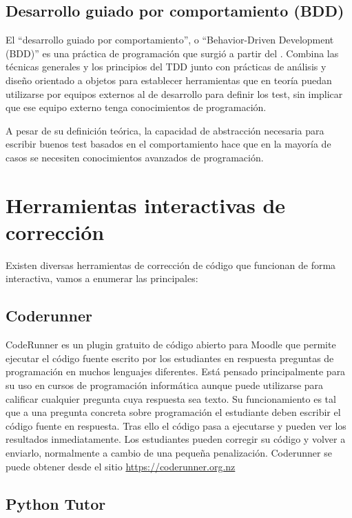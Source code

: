 \subsection {Desarrollo guiado por comportamiento (BDD)}

El ``desarrollo guiado por comportamiento'', o ``Behavior-Driven Development (BDD)'' es una práctica de programación que surgió a partir del . Combina las técnicas generales y los principios del TDD junto con prácticas de análisis y diseño orientado a objetos para establecer herramientas que en teoría puedan utilizarse por equipos externos al de desarrollo para definir los test, sin implicar que ese equipo externo tenga conocimientos de programación.

\bigskip
A pesar de su definición teórica, la capacidad de abstracción necesaria para escribir buenos test basados en el comportamiento hace que en la mayoría de casos se necesiten conocimientos avanzados de programación.

\section {Herramientas interactivas de corrección}

Existen diversas herramientas de corrección de código que funcionan de forma interactiva, vamos a enumerar las principales:

\subsection {Coderunner}

CodeRunner es un plugin gratuito de código abierto para Moodle que permite ejecutar el código fuente escrito por los estudiantes en respuesta preguntas de programación en muchos lenguajes diferentes. Está pensado principalmente para su uso en cursos de programación informática aunque puede utilizarse para calificar cualquier pregunta cuya respuesta sea texto. Su funcionamiento es tal que a una pregunta concreta sobre programación el estudiante deben escribir el código fuente en respuesta. Tras ello el código pasa a ejecutarse y pueden ver los resultados inmediatamente. Los estudiantes pueden corregir su código y volver a enviarlo, normalmente a cambio de una pequeña penalización. Coderunner se puede obtener desde el sitio \url{https://coderunner.org.nz}

\subsection {Python Tutor}

